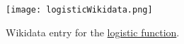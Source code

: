 \begin{figure}[tb]
  \centering
  \texttt{[image: logisticWikidata.png]}
  \caption{Wikidata entry for the \href{https://m.wikidata.org/w/index.php?oldid=723356182}{logistic function}.}
  \label{fgLogistic}
\end{figure}
